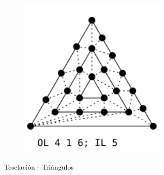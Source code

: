 \begin{figure}
\begin{subfigure}{0.45\textwidth}
	\end{subfigure}
	\hfill
	\begin{subfigure}{0.45\textwidth}
			\includegraphics[height=8cm,width=\textwidth]{figures/TriFull.png}	
	\end{subfigure}
	\caption{Teselación - Triángulos}
	\label{fig:triangletessellation}
\end{figure}

